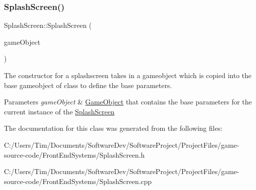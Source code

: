 \subsubsection{\texorpdfstring{Splash\+Screen()}{SplashScreen()}}
{\footnotesize\ttfamily Splash\+Screen\+::\+Splash\+Screen (\begin{DoxyParamCaption}\item[{const \hyperlink{class_game_object}{Game\+Object} \&}]{game\+Object }\end{DoxyParamCaption})}



The constructor for a splashscreen takes in a gameobject which is copied into the base gameobject of class to define the base parameters. 


\begin{DoxyParams}{Parameters}
{\em game\+Object} & \hyperlink{class_game_object}{Game\+Object} that contains the base parameters for the current instance of the \hyperlink{class_splash_screen}{Splash\+Screen} \\
\hline
\end{DoxyParams}


The documentation for this class was generated from the following files\+:\begin{DoxyCompactItemize}
\item 
C\+:/\+Users/\+Tim/\+Documents/\+Software\+Dev/\+Software\+Project/\+Project\+Files/game-\/source-\/code/\+Front\+End\+Systems/Splash\+Screen.\+h\item 
C\+:/\+Users/\+Tim/\+Documents/\+Software\+Dev/\+Software\+Project/\+Project\+Files/game-\/source-\/code/\+Front\+End\+Systems/Splash\+Screen.\+cpp\end{DoxyCompactItemize}
